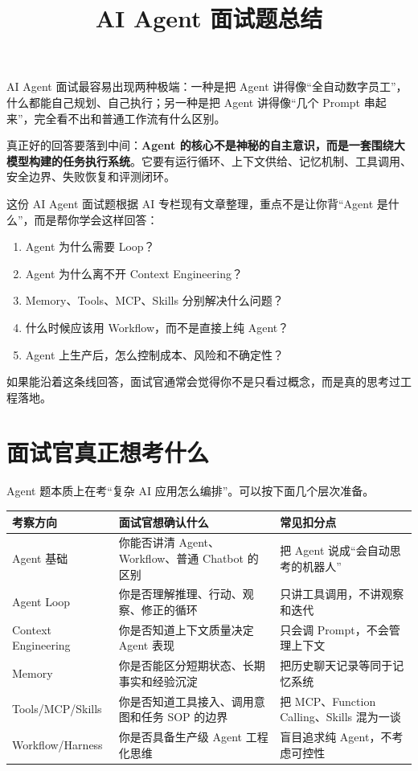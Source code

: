 \documentclass[10pt,a4paper]{ctexart}
\begin{document}
\title{AI Agent 面试题总结}
\date{}
\maketitle

AI Agent 面试最容易出现两种极端：一种是把 Agent 讲得像“全自动数字员工”，什么都能自己规划、自己执行；另一种是把 Agent 讲得像“几个 Prompt 串起来”，完全看不出和普通工作流有什么区别。



真正好的回答要落到中间：\textbf{Agent 的核心不是神秘的自主意识，而是一套围绕大模型构建的任务执行系统}。它要有运行循环、上下文供给、记忆机制、工具调用、安全边界、失败恢复和评测闭环。



这份 AI Agent 面试题根据 AI 专栏现有文章整理，重点不是让你背“Agent 是什么”，而是帮你学会这样回答：


\begin{enumerate}[itemsep=2pt, topsep=4pt]
  \item Agent 为什么需要 Loop？
  \item Agent 为什么离不开 Context Engineering？
  \item Memory、Tools、MCP、Skills 分别解决什么问题？
  \item 什么时候应该用 Workflow，而不是直接上纯 Agent？
  \item Agent 上生产后，怎么控制成本、风险和不确定性？
\end{enumerate}


如果能沿着这条线回答，面试官通常会觉得你不是只看过概念，而是真的思考过工程落地。



\section{面试官真正想考什么}


Agent 题本质上在考“复杂 AI 应用怎么编排”。可以按下面几个层次准备。


{\footnotesize
\begin{tabularx}{\textwidth}{|X|X|X|}
\hline
\textbf{考察方向} & \textbf{面试官想确认什么} & \textbf{常见扣分点} \\
\hline
Agent 基础 & 你能否讲清 Agent、Workflow、普通 Chatbot 的区别 & 把 Agent 说成“会自动思考的机器人” \\
\hline
Agent Loop & 你是否理解推理、行动、观察、修正的循环 & 只讲工具调用，不讲观察和迭代 \\
\hline
Context Engineering & 你是否知道上下文质量决定 Agent 表现 & 只会调 Prompt，不会管理上下文 \\
\hline
Memory & 你是否能区分短期状态、长期事实和经验沉淀 & 把历史聊天记录等同于记忆系统 \\
\hline
Tools/MCP/Skills & 你是否知道工具接入、调用意图和任务 SOP 的边界 & 把 MCP、Function Calling、Skills 混为一谈 \\
\hline
Workflow/Harness & 你是否具备生产级 Agent 工程化思维 & 盲目追求纯 Agent，不考虑可控性 \\
\hline
\end{tabularx}
}
\end{document}
